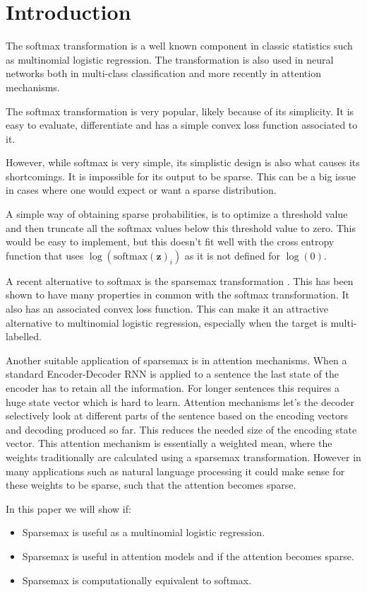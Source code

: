 \section{Introduction}

The softmax transformation is a well known component in classic statistics such as multinomial logistic regression. The transformation is also used in neural networks both in multi-class classification and more recently in attention mechanisms.

The softmax transformation is very popular, likely because of its simplicity. It is easy to evaluate, differentiate and has a simple convex loss function associated to it.

However, while softmax is very simple, its simplistic design is also what causes its shortcomings. It is impossible for its output to be sparse. This can be a big issue in cases where one would expect or want a sparse distribution.

A simple way of obtaining sparse probabilities, is to optimize a threshold value and then truncate all the softmax values below this threshold value to zero. This would be easy to implement, but this doesn't fit well with the cross entropy function that uses $\log(\mathrm{softmax}(\mathbf{z})_i)$ as it is not defined for $\log(0)$.

A recent alternative to softmax is the sparsemax transformation \cite{sparsemax}. This has been shown to have many properties in common with the softmax transformation. It also has an associated convex loss function. This can make it an attractive alternative to multinomial logistic regression, especially when the target is multi-labelled.

Another suitable application of sparsemax is in attention mechanisms. When a standard Encoder-Decoder RNN is applied to a sentence the last state of the encoder has to retain all the information. For longer sentences this requires a huge state vector which is hard to learn. Attention mechanisms let's the decoder selectively look at different parts of the sentence based on the encoding vectors and decoding produced so far. This reduces the needed size of the encoding state vector. This attention mechanism is essentially a weighted mean, where the weights traditionally are calculated using a sparsemax transformation. However in many applications such as natural language processing it could make sense for these weights to be sparse, such that the attention becomes sparse.

In this paper we will show if:
\begin{itemize}
\setlength\itemsep{-0.3em}
\item Sparsemax is useful as a multinomial logistic regression.
\item Sparsemax is useful in attention models and if the attention becomes sparse.
\item Sparsemax is computationally equivalent to softmax.
\end{itemize}
